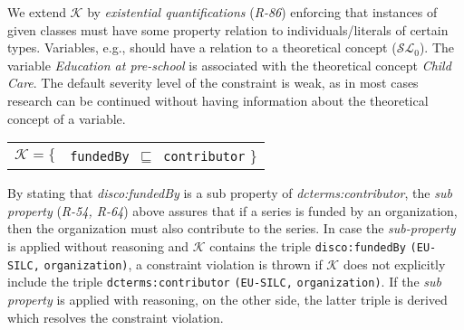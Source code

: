 \documentclass{llncs}
\newcommand{\ms}[1]{\texttt{#1}}
\newenvironment{DL}{
  \vspace{0cm}
	\begin{center}
  \begin{tabular}{c l}

}{
  \end{tabular}
	\end{center}
}
\begin{document}
{We extend $\mathcal{K}$ by \emph{existential quantifications} (\emph{R-86}) enforcing that instances of given classes must have some property relation to individuals/literals of certain types.
Variables, e.g., should have a relation to a theoretical concept ($\mathcal{SL}_{0}$).
The variable \emph{Education at pre-school} is associated with the theoretical concept \emph{Child Care}. 
The default severity level of the constraint is weak, as in most cases research can be continued without having information about the theoretical concept of a variable.

\begin{center}
\begin{DL} 
$\mathcal{K}=\{$ 
  &\ms{fundedBy $\sqsubseteq$ contributor}
 \}\\ 
\end{DL}
\end{center}

By stating that \emph{disco:fundedBy} is a sub property of \emph{dcterms:contributor},
the {\em sub property} (\emph{R-54, R-64}) above assures that if a series is funded by an organization, then the organization must also contribute to the series.
In case the \emph{sub-property} is applied without reasoning and $\mathcal{K}$ contains the triple \ms{disco:fundedBy} \ms{(EU-SILC,} \ms{organization)},
a constraint violation is thrown if $\mathcal{K}$ does not explicitly include the triple \ms{dcterms:contributor} \ms{(EU-SILC,} \ms{organization)}.
If the \emph{sub property} is applied with reasoning, on the other side, the latter triple is derived which resolves the constraint violation.


}
\end{document}
